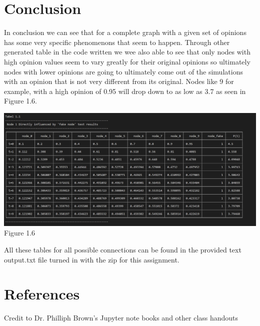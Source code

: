 \documentclass[letterpaper]{article}
\begin{document}
\section{Conclusion}

In conclusion we can see that for a complete graph with a given set of opinions has some very specific phenomenons that seem to happen. Through other generated table in the code written we wee also able to see that only nodes with high opinion values seem to vary greatly for their original opinions so ultimately nodes with lower opinions are going to ultimately come out of the simulations with an opinion that is not very different from its original.  Nodes like 9 for example, with a high opinion of 0.95 will drop down to as low as 3.7 as seen in Figure 1.6.
\begin{center}
	\includegraphics[scale=0.4]{./Images/Figure1.6} \\
	Figure 1.6
\end{center}
All these tables for all possible connections can be found in the provided text output.txt file turned in with the zip for this assignment.

\section{References}
Credit to Dr. Philliph Brown's Jupyter note books and other class handouts
\end{document}
